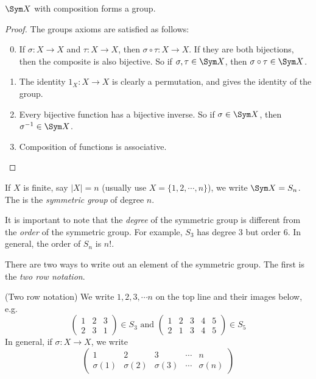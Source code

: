 \documentclass[a4paper]{article}
\begin{document}
\begin{thm}
  $\Sym X$ with composition forms a group.
\end{thm}

\begin{proof}
  The groups axioms are satisfied as follows:
  \begin{enumerate}[label=\arabic{*}.]
      \setcounter{enumi}{-1}
    \item If $\sigma: X\to X$ and $\tau: X\to X$, then $\sigma\circ\tau:X\to X$. If they are both bijections, then the composite is also bijective. So if $\sigma, \tau\in \Sym X$, then $\sigma\circ\tau\in\Sym X$.
    \item The identity $1_X:X\to X$ is clearly a permutation, and gives the identity of the group.
    \item Every bijective function has a bijective inverse. So if $\sigma\in \Sym X$, then $\sigma^{-1} \in \Sym X$.
    \item Composition of functions is associative.
  \end{enumerate}
\end{proof}

\begin{defi}
  If $X$ is finite, say $|X| = n$ (usually use $X = \{1, 2, \cdots, n\}$), we write $\Sym X = S_n$. The is the \emph{symmetric group} of degree $n$.
\end{defi}
It is important to note that the \emph{degree} of the symmetric group is different from the \emph{order} of the symmetric group. For example, $S_3$ has degree 3 but order 6. In general, the order of $S_n$ is $n!$.

There are two ways to write out an element of the symmetric group. The first is the \emph{two row notation}.
\begin{notation}
  (Two row notation) We write $1, 2, 3, \cdots n$ on the top line and their images below, e.g.
  \[
    \begin{pmatrix}
      1 & 2 & 3\\
      2 & 3 & 1
    \end{pmatrix}\in S_3 \text{ and }
    \begin{pmatrix}
      1 & 2 & 3 & 4 & 5\\
      2 & 1 & 3 & 4 & 5
    \end{pmatrix}\in S_5
  \]
  In general, if $\sigma: X\to X$, we write
  \[
    \begin{pmatrix}
      1 & 2 & 3 &\cdots& n\\
      \sigma(1) & \sigma(2)&\sigma(3) &\cdots& \sigma{(n)}
    \end{pmatrix}
  \]
\end{notation}
\end{document}
